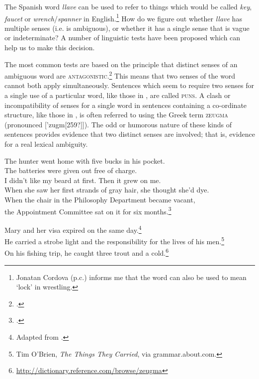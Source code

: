 The Spanish word \textit{llave} can be used to refer to things which would be called \textit{key}, \textit{faucet} or \textit{wrench}/\textit{spanner} in English.\footnote{Jonatan Cordova (p.c.) informs me that the word can also be used to mean ‘lock’ in wrestling.} How do we figure out whether \textit{llave} has multiple senses (i.e. is ambiguous), or whether it has a single sense that is vague or indeterminate? A number of linguistic tests have been proposed which can help us to make this decision. 



The most common tests are based on the principle that distinct senses of an ambiguous word are \textsc{antagonistic}.\footnote{\citet[61]{Cruse1986}.} This means that two senses of the word cannot both apply simultaneously. Sentences which seem to require two senses for a single use of a particular word, like those in , are called \textsc{puns}. A clash or incompatibility of senses for a single word in sentences containing a co-ordinate structure, like those in , is often referred to using the Greek term \textsc{zeugma} (pronounced ['zugm[259?]]). The odd or humorous nature of these kinds of sentences provides evidence that two distinct senses are involved; that is, evidence for a real lexical ambiguity.


\ea \label{ex:5.4}
\ea The hunter went home with five bucks in his pocket.\\
\ex The batteries were given out free of charge.\\
\ex I didn’t like my beard at first. Then it grew on me.\\
\ex When she saw her first strands of gray hair, she thought she’d dye.\\
\ex When the chair in the Philosophy Department became vacant,\\
  the Appointment Committee sat on it for six months.\footnote{\citet[108]{Cruse2000}.}
                       \z
\z

\ea \label{ex:5.5}
\ea Mary and her visa expired on the same day.\footnote{Adapted from \citet[61]{Cruse1986}.}\\
\ex He carried a strobe light and the responsibility for the lives of his men.\footnote{Tim O’Brien, \textit{The Things They Carried}, via grammar.about.com.}\\
\ex On his fishing trip, he caught three trout and a cold.\footnote{\url{http://dictionary.reference.com/browse/zeugma}}
                       \z
\z


